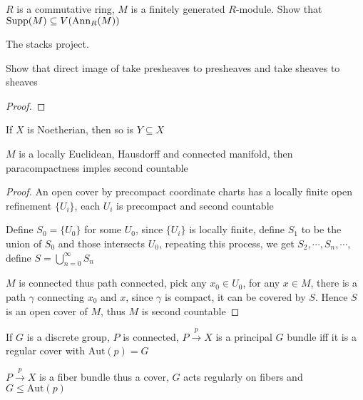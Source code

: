 \documentclass[main]{subfiles}
\begin{document}
\begin{exercise}
$R$ is a commutative ring, $M$ is a finitely generated $R$-module. Show that $\operatorname{Supp}(M)\subseteq V(\operatorname{Ann}_R(M))$
\end{exercise}

\begin{solution}
The stacks project.
\end{solution}

\begin{exercise}
Show that direct image of take presheaves to presheaves and take sheaves to sheaves
\end{exercise}

\begin{proof}

\end{proof}

\begin{exercise}
If $X$ is Noetherian, then so is $Y\subseteq X$
\end{exercise}

\begin{exercise}
$M$ is a locally Euclidean, Hausdorff and connected manifold, then paracompactness imples second countable
\end{exercise}

\begin{proof}
An open cover by precompact coordinate charts has a locally finite open refinement $\{U_{i}\}$, each $U_{i}$ is precompact and second countable \par
Define $S_{0}= \{U_0\}$ for some $U_0$, since $\{U_{i}\}$ is locally finite, define $S_{1}$ to be the union of $S_0$ and those intersects $U_0$, repeating this process, we get $ S_{2},\cdots,S_{n},\cdots $, define $\displaystyle S = \bigcup_{n=0}^{\infty} S_{n} $ \par
$M$ is connected thus path connected, pick any $ x_{0} \in U_0 $, for any $x \in M $, there is a path $\gamma$ connecting $x_{0}$ and $x$, since $\gamma$ is compact, it can be covered by $S$. Hence $S$ is an open cover of $M$, thus $M$ is second countable
\end{proof}

\begin{exercise}
If $G$ is a discrete group, $P$ is connected, $P\xrightarrow{p}X$ is a principal $G$ bundle iff it is a regular cover with $\mathrm{Aut}(p)=G$
\end{exercise}

\begin{solution}
$P\xrightarrow{p}X$ is a fiber bundle thus a cover, $G$ acts regularly on fibers and $G\leq\mathrm{Aut}(p)$
\end{solution}
\end{document}

